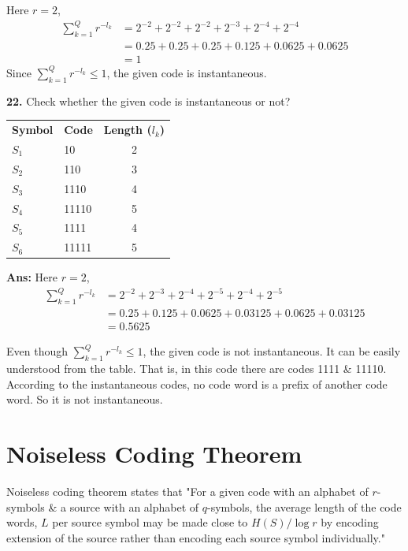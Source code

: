 \documentclass[12pt]{article}
\begin{document}
Here $r = 2$,
\begin{align*}
	\sum_{k=1}^{Q} r^{-l_k} & = 2^{-2} + 2^{-2} + 2^{-2} + 2^{-3} + 2^{-4} + 2^{-4} \\
	                        & = 0.25 + 0.25 + 0.25 + 0.125 + 0.0625 + 0.0625        \\
	                        & = 1
\end{align*}
Since $\sum_{k=1}^{Q} r^{-l_k} \le 1$, the given code is instantaneous.


\vspace{0.5cm}
\noindent \textbf{22.} Check whether the given code is instantaneous or not?
\begin{table}[ht]
	\centering
	\renewcommand{\arraystretch}{1.2}
	\begin{tabular}{l l c}
		\rowcolor{black!10}
		\textbf{Symbol} & \textbf{Code} & \textbf{Length ($l_k$)} \\
		$S_1$           & 10            & 2                       \\
		$S_2$           & 110           & 3                       \\
		$S_3$           & 1110          & 4                       \\
		$S_4$           & 11110         & 5                       \\
		$S_5$           & 1111          & 4                       \\
		$S_6$           & 11111         & 5                       \\
	\end{tabular}
\end{table}

\textbf{Ans:}
Here $r = 2$,
\begin{align*}
	\sum_{k=1}^{Q} r^{-l_k} & = 2^{-2} + 2^{-3} + 2^{-4} + 2^{-5} + 2^{-4} + 2^{-5} \\
	                        & = 0.25 + 0.125 + 0.0625 + 0.03125 + 0.0625 + 0.03125  \\
	                        & = 0.5625
\end{align*}

Even though $\sum_{k=1}^{Q} r^{-l_k} \le 1$, the given code is not instantaneous.
It can be easily understood from the table. That is, in this code there are codes 1111 \& 11110. According to the instantaneous codes, no code word is a prefix of another code word. So it is not instantaneous.

\section{Noiseless Coding Theorem}
Noiseless coding theorem states that "For a given code with an alphabet of $r$-symbols \& a source with an alphabet of $q$-symbols, the average length of the code words, $L$ per source symbol may be made close to $H(S)/\log r$ by encoding extension of the source rather than encoding each source symbol individually."
\end{document}
